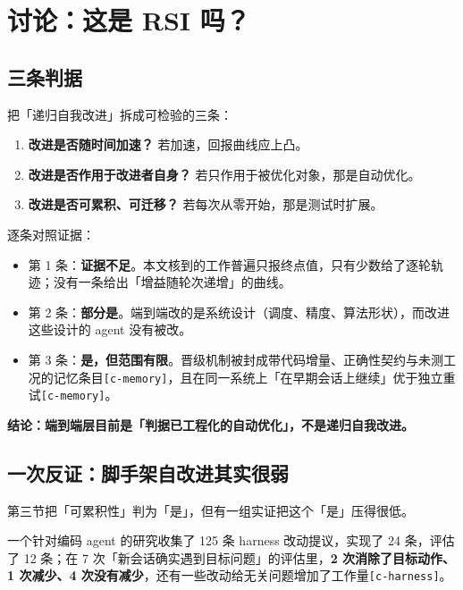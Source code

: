 \section{讨论：这是 RSI 吗？}

\subsection{三条判据}

把「递归自我改进」拆成可检验的三条：


\begin{enumerate}
  \item \textbf{改进是否随时间加速？} 若加速，回报曲线应上凸。
  \item \textbf{改进是否作用于改进者自身？} 若只作用于被优化对象，那是自动优化。
  \item \textbf{改进是否可累积、可迁移？} 若每次从零开始，那是测试时扩展。
\end{enumerate}

逐条对照证据：


\begin{itemize}
  \item 第 1 条：\textbf{证据不足}。本文核到的工作普遍只报终点值，只有少数给了逐轮轨迹；没有一条给出「增益随轮次递增」的曲线。
  \item 第 2 条：\textbf{部分是}。端到端改的是系统设计（调度、精度、算法形状），而改进这些设计的 agent 没有被改。
  \item 第 3 条：\textbf{是，但范围有限}。晋级机制被封成带代码增量、正确性契约与未测工况的记忆条目{\scriptsize\texttt{[c-\hspace{0pt}memory]}}，且在同一系统上「在早期会话上继续」优于独立重试{\scriptsize\texttt{[c-\hspace{0pt}memory]}}。
\end{itemize}

\textbf{结论：端到端层目前是「判据已工程化的自动优化」，不是递归自我改进。}


\subsection{一次反证：脚手架自改进其实很弱}

第三节把「可累积性」判为「是」，但有一组实证把这个「是」压得很低。


一个针对编码 agent 的研究收集了 125 条 harness 改动提议，实现了 24 条，评估了 12 条；在 7 次「新会话确实遇到目标问题」的评估里，\textbf{2 次消除了目标动作、1 次减少、4 次没有减少}，还有一些改动给无关问题增加了工作量{\scriptsize\texttt{[c-\hspace{0pt}harness]}}。


